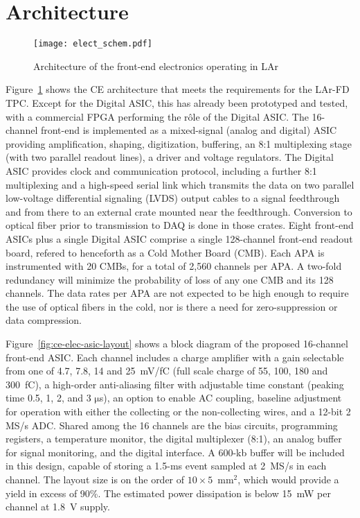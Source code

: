 %
\section{Architecture}
\label{sec:fe-arch}
 
\begin{figure}[htbp]
\centering
\texttt{[image: elect\_schem.pdf]}
\caption{Architecture of the front-end electronics operating in LAr}
\label{fig:ce-elec-schematic}
\end{figure}

Figure~\ref{fig:ce-elec-schematic} shows the CE architecture that meets the requirements for the LAr-FD TPC.
Except for the Digital ASIC, this has already been prototyped and tested,
with a commercial FPGA performing the r\^ole of the Digital ASIC. 
The 16-channel front-end is implemented as a mixed-signal (analog and digital) ASIC
providing amplification, shaping, digitization, buffering,
an 8:1 multiplexing stage (with two parallel readout lines), a driver and voltage regulators.
The Digital ASIC provides clock and communication protocol, including a further 8:1 multiplexing
and a high-speed serial link which transmits the data on two parallel low-voltage differential signaling (LVDS)
output cables to a signal feedthrough and from there to an external crate mounted near the feedthrough.
Conversion to optical fiber prior to transmission to DAQ is done in those crates.
Eight front-end ASICs plus a single Digital ASIC comprise a single 128-channel front-end readout board,
refered to henceforth as a Cold Mother Board (CMB).
Each APA is instrumented with 20 CMBs, for a total of 2,560 channels per APA.
A two-fold redundancy will minimize the probability of loss of any one CMB and its 128 channels.
The data rates per APA are not expected to be high enough to require the use of optical fibers in the cold,
nor is there a need for zero-suppression or data compression.

Figure~\ref{fig:ce-elec-asic-layout} shows a block diagram of the proposed 16-channel front-end ASIC.
Each channel includes a charge amplifier with a gain selectable from one of 4.7, 7.8, 14 and 25~mV/fC
(full scale charge of 55, 100, 180 and 300~fC),
a high-order anti-aliasing filter with adjustable time
constant (peaking time 0.5, 1, 2, and 3 $\mathrm{\mu}$s),
an option to enable AC coupling,
baseline adjustment for operation with either the collecting or the non-collecting wires,
and a 12-bit 2 MS/s ADC.
Shared among the 16 channels are the bias circuits, programming registers,
a temperature monitor, the digital multiplexer (8:1),
an analog buffer for signal monitoring, and the digital interface.
A 600-kb buffer will be included in this design, capable of storing a 1.5-ms 
event sampled at 2~MS/s in each channel.
The layout size is on the order of $10 \times 5$~mm${^2}$, which would provide a yield in excess of 90\%.
The estimated power dissipation is below 15~mW per channel at 1.8~V supply.


